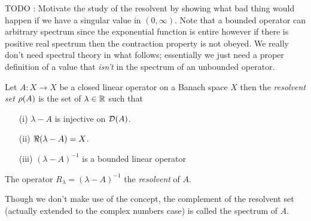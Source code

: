 TODO : Motivate the study of the resolvent by showing what bad thing would happen if we have a singular value in $(0,\infty)$.  Note that a bounded operator can arbitrary spectrum since the exponential function is entire however if there is positive real spectrum then the contraction property is not obeyed.  We really don't need spectral theory in what follows; essentially we just need a proper definition of a value that \emph{isn't} in the spectrum of an unbounded operator.

\begin{defn}Let $A : X \to X$ be a closed linear operator on a Banach
  space $X$ then the \emph{resolvent set} $\rho(A)$ is the set of $\lambda \in \mathbb{R}$ such that
\begin{itemize}
\item[(i)] $\lambda - A$ is injective on $\mathcal{D}(A)$.
\item[(ii)] $\Re(\lambda - A) = X$.
\item[(iii)] $(\lambda -A)^{-1}$ is a bounded linear operator
\end{itemize}
The operator $R_\lambda = (\lambda -A)^{-1}$ the \emph{resolvent} of $A$.
\end{defn}
Though we don't make use of the concept, the complement of the resolvent set (actually extended to the complex numbers case) is called the spectrum of $A$.

